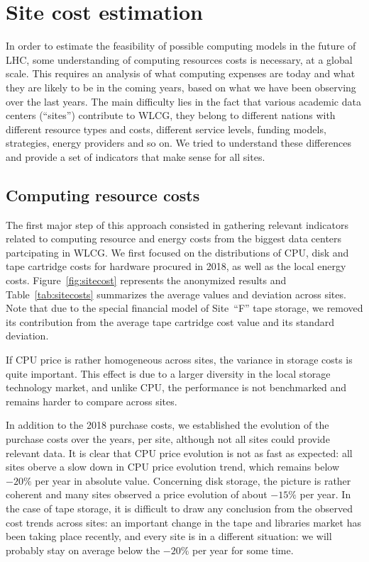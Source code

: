 \section{Site cost estimation}

In order to estimate the feasibility of possible computing models in
the future of LHC, some understanding of computing resources costs is
necessary, at a global scale.  This requires an analysis of what
computing expenses are today and what they are likely to be in the
coming years, based on what we have been observing over the last
years.  The main difficulty lies in the fact that various academic
data centers (``sites'') contribute to WLCG, they belong to different
nations with different resource types and costs, different service
levels, funding models, strategies, energy providers and so on. We
tried to understand these differences and provide a set of indicators
that make sense for all sites.

\subsection{\label{sec:sitecost:computing}Computing resource costs}
The first major step of this approach consisted in gathering relevant
indicators related to computing resource and energy costs from the
biggest data centers partcipating in WLCG.  We first focused on the
distributions of CPU, disk and tape cartridge costs for hardware
procured in 2018, as well as the local energy costs.
Figure~\ref{fig:sitecost} represents the anonymized results and
Table~\ref{tab:sitecosts} summarizes the average values and deviation
across sites. Note that due to the special financial model of Site~``F''
tape storage, we removed its contribution from the average tape
cartridge cost value and its standard deviation.

If CPU price is rather homogeneous across sites, the variance in
storage costs is quite important. This effect is due to a larger
diversity in the local storage technology market, and unlike CPU, the
performance is not benchmarked and remains harder to compare across
sites.

In addition to the 2018 purchase costs, we established the evolution
of the purchase costs over the years, per site, although not all sites
could provide relevant data. It is clear that CPU price evolution is
not as fast as expected: all sites oberve a slow down in CPU price
evolution trend, which remains below $-20 \%$ per year in absolute
value.  Concerning disk storage, the picture is rather coherent and
many sites observed a price evolution of about $-15 \%$ per year.  In
the case of tape storage, it is difficult to draw any conclusion from
the observed cost trends across sites: an important change in the tape
and libraries market has been taking place recently, and every site is
in a different situation: we will probably stay on average below the
$-20 \%$ per year for some time.


